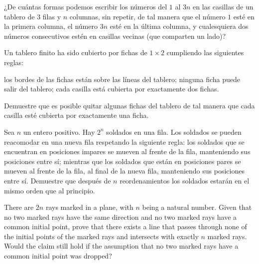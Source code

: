 \begin{probEG}
  ¿De cuántas formas podemos escribir los números del $1$ al $3n$ en las
  casillas de un tablero de $3$ filas y $n$ columnas, sin repetir, de tal manera
  que el número $1$ esté en la primera columna, el número $3n$ esté en la última
  columna, y cualesquiera dos números consecutivos estén en casillas vecinas
  (que comparten un lado)?
\end{probEG}

\begin{probEG}
  Un tablero finito ha sido cubierto por fichas de $1\times 2$ cumpliendo las
  siguientes reglas:
  \begin{itemize}
    \ii los bordes de las fichas están sobre las líneas del tablero;
    \ii ninguna ficha puede salir del tablero;
    \ii cada casilla está cubierta por exactamente dos fichas.
  \end{itemize}
  Demuestre que es posible quitar algunas fichas del tablero de tal manera que
  cada casilla esté cubierta por exactamente una ficha.
\end{probEG}

\begin{probEG}
  Sea $n$ un entero positivo. Hay $2^n$ soldados en una fila. Los soldados se
  pueden reacomodar en una nueva fila respetando la siguiente regla: los
  soldados que se encuentran en posiciones impares se mueven al frente de la
  fila, manteniendo sus posiciones entre sí; mientras que los soldados que están
  en posiciones pares se mueven al frente de la fila, al final de la nueva fila,
  manteniendo sus posiciones entre sí. Demuestre que después de $n$
  reordenamientos los soldados estarán en el mismo orden que al principio.
\end{probEG}

\begin{probMG}
  \begin{enumerate}[(a)]
    \ii There are $2n$ rays marked in a plane, with $n$ being a natural number.
    Given that no two marked rays have the same direction and no two marked rays
    have a common initial point, prove that there exists a line that passes
    through none of the initial points of the marked rays and intersects with
    exactly $n$ marked rays.
    \ii Would the claim still hold if the assumption that no two marked rays
    have a common initial point was dropped?
  \end{enumerate}
\end{probMG}


